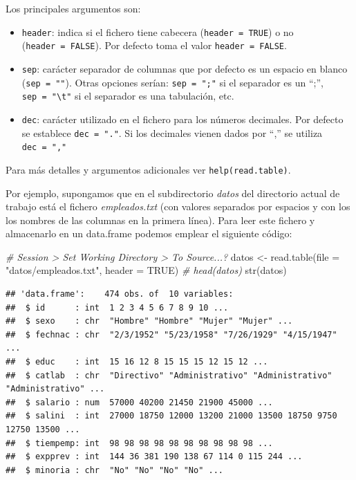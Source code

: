 \documentclass[
]{book}
\newenvironment{Shaded}{\begin{snugshade}}{\end{snugshade}}
\newcommand{\AttributeTok}[1]{\textcolor[rgb]{0.77,0.63,0.00}{#1}}
\newcommand{\CommentTok}[1]{\textcolor[rgb]{0.56,0.35,0.01}{\textit{#1}}}
\newcommand{\ConstantTok}[1]{\textcolor[rgb]{0.00,0.00,0.00}{#1}}
\newcommand{\FunctionTok}[1]{\textcolor[rgb]{0.00,0.00,0.00}{#1}}
\newcommand{\NormalTok}[1]{#1}
\newcommand{\OtherTok}[1]{\textcolor[rgb]{0.56,0.35,0.01}{#1}}
\newcommand{\StringTok}[1]{\textcolor[rgb]{0.31,0.60,0.02}{#1}}
\theoremstyle{break}
\theoremstyle{nonumberplain}
\begin{document}
Los principales argumentos son:

\begin{itemize}
\item
  \texttt{header}: indica si el fichero tiene cabecera (\texttt{header\ =\ TRUE}) o no
  (\texttt{header\ =\ FALSE}). Por defecto toma el valor \texttt{header\ =\ FALSE}.
\item
  \texttt{sep}: carácter separador de columnas que por defecto es un espacio
  en blanco (\texttt{sep\ =\ ""}). Otras opciones serían: \texttt{sep\ =\ ";"} si el separador es
  un ``;'', \texttt{sep\ =\ "\textbackslash{}t"} si el separador es una tabulación, etc.
\item
  \texttt{dec}: carácter utilizado en el fichero para los números decimales.
  Por defecto se establece \texttt{dec\ =\ "."}. Si los decimales vienen dados
  por ``,'' se utiliza \texttt{dec\ =\ ","}
\end{itemize}

Para más detalles y argumentos adicionales ver \texttt{help(read.table)}.

Por ejemplo, supongamos que en el subdirectorio \emph{datos} del directorio actual de trabajo está el fichero \emph{empleados.txt} (con valores separados por espacios y con los los nombres de las columnas en la primera línea).
Para leer este fichero y almacenarlo en un data.frame podemos emplear el siguiente código:

\begin{Shaded}
\begin{Highlighting}[]
\CommentTok{\# Session \textgreater{} Set Working Directory \textgreater{} To Source...?}
\NormalTok{datos }\OtherTok{\textless{}{-}} \FunctionTok{read.table}\NormalTok{(}\AttributeTok{file =} \StringTok{"datos/empleados.txt"}\NormalTok{, }\AttributeTok{header =} \ConstantTok{TRUE}\NormalTok{)}
\CommentTok{\# head(datos)}
\FunctionTok{str}\NormalTok{(datos)}
\end{Highlighting}
\end{Shaded}

\begin{verbatim}
## 'data.frame':    474 obs. of  10 variables:
##  $ id      : int  1 2 3 4 5 6 7 8 9 10 ...
##  $ sexo    : chr  "Hombre" "Hombre" "Mujer" "Mujer" ...
##  $ fechnac : chr  "2/3/1952" "5/23/1958" "7/26/1929" "4/15/1947" ...
##  $ educ    : int  15 16 12 8 15 15 15 12 15 12 ...
##  $ catlab  : chr  "Directivo" "Administrativo" "Administrativo" "Administrativo" ...
##  $ salario : num  57000 40200 21450 21900 45000 ...
##  $ salini  : int  27000 18750 12000 13200 21000 13500 18750 9750 12750 13500 ...
##  $ tiempemp: int  98 98 98 98 98 98 98 98 98 98 ...
##  $ expprev : int  144 36 381 190 138 67 114 0 115 244 ...
##  $ minoria : chr  "No" "No" "No" "No" ...
\end{verbatim}
\end{document}
